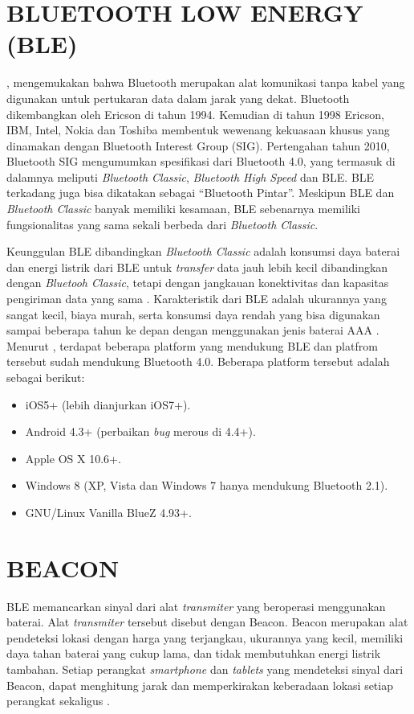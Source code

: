 \section{\uppercase{BLUETOOTH LOW ENERGY (BLE)}}
\cite{Keluza2017}, mengemukakan bahwa Bluetooth merupakan alat komunikasi tanpa kabel yang digunakan untuk pertukaran data dalam jarak yang dekat. Bluetooth dikembangkan oleh Ericson di tahun 1994. Kemudian di tahun 1998 Ericson, IBM, Intel, Nokia dan Toshiba membentuk wewenang kekuasaan khusus yang dinamakan dengan Bluetooth Interest Group (SIG). Pertengahan tahun 2010, Bluetooth SIG mengumumkan spesifikasi dari Bluetooth 4.0, yang termasuk di dalamnya meliputi \textit{Bluetooth Classic}, \textit{Bluetooth High Speed} dan BLE. BLE terkadang juga bisa dikatakan sebagai “Bluetooth Pintar”. Meskipun BLE dan \textit{Bluetooth Classic} banyak memiliki kesamaan, BLE sebenarnya memiliki fungsionalitas yang sama sekali berbeda dari \textit{Bluetooth Classic}. 

\par Keunggulan BLE dibandingkan \textit{Bluetooth Classic} adalah konsumsi daya baterai dan energi listrik dari BLE untuk \textit{transfer} data jauh lebih kecil dibandingkan dengan \textit{Bluetooh Classic}, tetapi dengan jangkauan konektivitas dan kapasitas pengiriman data yang sama \citep{bluetoothsig2010}. Karakteristik dari BLE adalah ukurannya yang sangat kecil, biaya murah, serta konsumsi daya rendah yang bisa digunakan sampai beberapa tahun ke depan dengan menggunakan jenis baterai AAA \citep{Keluza2017}. Menurut \cite{Paganini2015}, terdapat beberapa platform yang mendukung BLE dan platfrom tersebut sudah mendukung Bluetooth 4.0. Beberapa platform tersebut adalah sebagai berikut:
\begin {itemize}
\itemsep0em
	\item iOS5+ (lebih dianjurkan iOS7+).
	\item Android 4.3+ (perbaikan \textit{bug} merous di 4.4+).
	\item Apple OS X 10.6+.
	\item Windows 8 (XP, Vista dan Windows 7 hanya mendukung Bluetooth 2.1).
	\item GNU/Linux Vanilla BlueZ 4.93+.
\end{itemize}

\section{\uppercase{BEACON}}
BLE memancarkan sinyal dari alat \textit{transmiter} yang beroperasi menggunakan baterai. Alat \textit{transmiter} tersebut disebut dengan Beacon. Beacon merupakan alat pendeteksi lokasi dengan harga yang terjangkau, ukurannya yang kecil, memiliki daya tahan baterai yang cukup lama, dan tidak membutuhkan energi listrik tambahan. Setiap perangkat \textit{smartphone} dan \textit{tablets} yang mendeteksi sinyal dari Beacon, dapat menghitung jarak dan memperkirakan keberadaan lokasi setiap perangkat sekaligus \citep{Keluza2017}.

